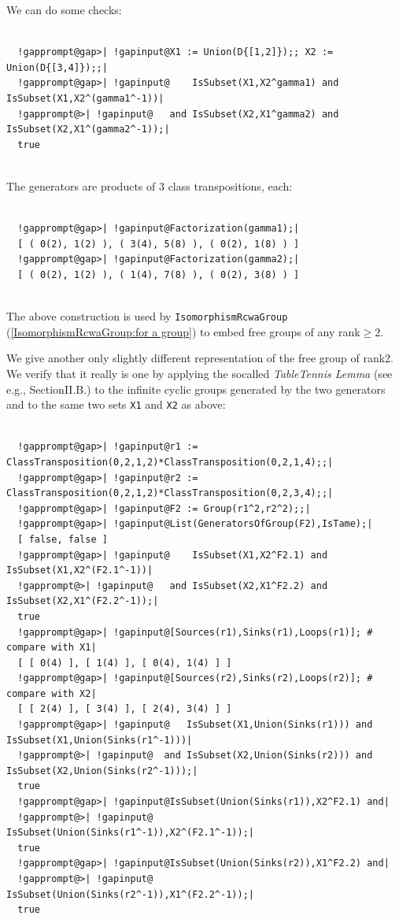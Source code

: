 \documentclass[a4paper,11pt]{report}
\begin{document}
{{\begin{Verbatim}[commandchars=!@|,fontsize=\small,frame=single,label=Example]
\end{Verbatim}
 We can do some checks: 
\begin{Verbatim}[commandchars=!@|,fontsize=\small,frame=single,label=Example]
  
  !gapprompt@gap>| !gapinput@X1 := Union(D{[1,2]});; X2 := Union(D{[3,4]});;|
  !gapprompt@gap>| !gapinput@    IsSubset(X1,X2^gamma1) and IsSubset(X1,X2^(gamma1^-1))|
  !gapprompt@>| !gapinput@   and IsSubset(X2,X1^gamma2) and IsSubset(X2,X1^(gamma2^-1));|
  true
  
\end{Verbatim}
 The generators are products of 3 class transpositions, each: 
\begin{Verbatim}[commandchars=!@|,fontsize=\small,frame=single,label=Example]
  
  !gapprompt@gap>| !gapinput@Factorization(gamma1);|
  [ ( 0(2), 1(2) ), ( 3(4), 5(8) ), ( 0(2), 1(8) ) ]
  !gapprompt@gap>| !gapinput@Factorization(gamma2);|
  [ ( 0(2), 1(2) ), ( 1(4), 7(8) ), ( 0(2), 3(8) ) ]
  
\end{Verbatim}
 The above construction is used by \texttt{IsomorphismRcwaGroup} (\ref{IsomorphismRcwaGroup:for a group}) to embed free groups of any rank{\nobreakspace}$\geq 2$. 

 We give another only slightly different representation of the free group of
rank{\nobreakspace}2. We verify that it really is one by applying the
so\texttt{}called \emph{Table\texttt{}Tennis Lemma} (see e.g.{\nobreakspace}\cite{LaHarpe00}, Section{\nobreakspace}II.B.) to the infinite cyclic groups generated by the
two generators and to the same two sets \texttt{X1} and \texttt{X2} as above: 
\begin{Verbatim}[commandchars=!@|,fontsize=\small,frame=single,label=Example]
  
  !gapprompt@gap>| !gapinput@r1 := ClassTransposition(0,2,1,2)*ClassTransposition(0,2,1,4);;|
  !gapprompt@gap>| !gapinput@r2 := ClassTransposition(0,2,1,2)*ClassTransposition(0,2,3,4);;|
  !gapprompt@gap>| !gapinput@F2 := Group(r1^2,r2^2);;|
  !gapprompt@gap>| !gapinput@List(GeneratorsOfGroup(F2),IsTame);|
  [ false, false ]
  !gapprompt@gap>| !gapinput@    IsSubset(X1,X2^F2.1) and IsSubset(X1,X2^(F2.1^-1))|
  !gapprompt@>| !gapinput@   and IsSubset(X2,X1^F2.2) and IsSubset(X2,X1^(F2.2^-1));|
  true
  !gapprompt@gap>| !gapinput@[Sources(r1),Sinks(r1),Loops(r1)]; # compare with X1|
  [ [ 0(4) ], [ 1(4) ], [ 0(4), 1(4) ] ]
  !gapprompt@gap>| !gapinput@[Sources(r2),Sinks(r2),Loops(r2)]; # compare with X2|
  [ [ 2(4) ], [ 3(4) ], [ 2(4), 3(4) ] ]
  !gapprompt@gap>| !gapinput@   IsSubset(X1,Union(Sinks(r1))) and IsSubset(X1,Union(Sinks(r1^-1)))|
  !gapprompt@>| !gapinput@  and IsSubset(X2,Union(Sinks(r2))) and IsSubset(X2,Union(Sinks(r2^-1)));|
  true
  !gapprompt@gap>| !gapinput@IsSubset(Union(Sinks(r1)),X2^F2.1) and|
  !gapprompt@>| !gapinput@   IsSubset(Union(Sinks(r1^-1)),X2^(F2.1^-1));|
  true
  !gapprompt@gap>| !gapinput@IsSubset(Union(Sinks(r2)),X1^F2.2) and|
  !gapprompt@>| !gapinput@   IsSubset(Union(Sinks(r2^-1)),X1^(F2.2^-1));|
  true
  

\end{Verbatim}}}
\end{document}
